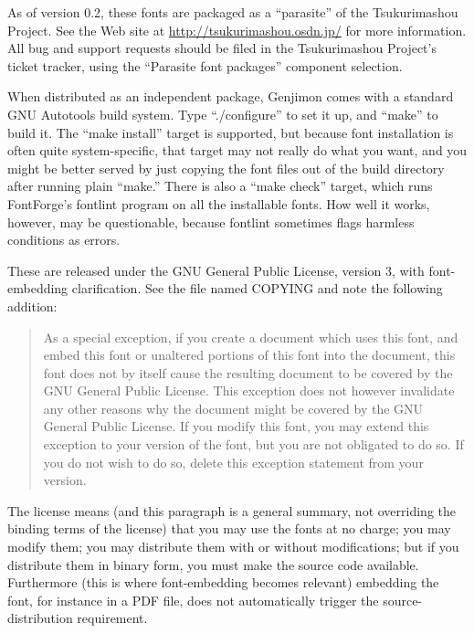 \documentclass[12pt]{article}
\begin{document}
As of version 0.2, these fonts are packaged as a ``parasite'' of the
Tsukurimashou Project.  See the Web site at
\url{http://tsukurimashou.osdn.jp/} for more information.  All bug
and support requests should be filed in the Tsukurimashou Project's ticket
tracker, using the ``Parasite font packages'' component selection.

When distributed as an independent package, Genjimon comes with a standard
GNU Autotools build system.  Type ``./configure'' to set it up, and ``make''
to build it.  The ``make install'' target is supported, but because font
installation is often quite system-specific, that target may not really do
what you want, and you might be better served by just copying the font files
out of the build directory after running plain ``make.''  There is also a
``make check'' target, which runs FontForge's fontlint program on all the
installable fonts.  How well it works, however, may be questionable, because
fontlint sometimes flags harmless conditions as errors.

These are released under the GNU General Public License, version 3, with
font-embedding clarification.  See the file named COPYING and note the
following addition:

\begin{quotation}
As a special exception, if you create a document which uses this font, and
embed this font or unaltered portions of this font into the document, this
font does not by itself cause the resulting document to be covered by the
GNU General Public License. This exception does not however invalidate any
other reasons why the document might be covered by the GNU General Public
License. If you modify this font, you may extend this exception to your
version of the font, but you are not obligated to do so. If you do not wish
to do so, delete this exception statement from your version.
\end{quotation}

The license means (and this paragraph is a general summary, not overriding
the binding terms of the license) that you may use the fonts at no charge;
you may modify them; you may distribute them with or without modifications;
but if you distribute them in binary form, you must make the source code
available.  Furthermore (this is where font-embedding becomes relevant)
embedding the font, for instance in a PDF file, does not automatically
trigger the source-distribution requirement.
\end{document}
